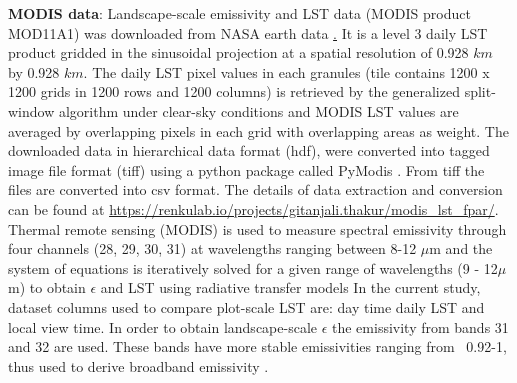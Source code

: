 \documentclass[fleqn,10pt]{wlscirep}
\begin{document}
\textbf{MODIS data}:
Landscape-scale emissivity and LST data (MODIS product MOD11A1) was downloaded from NASA earth data \href{https://lpdaac.usgs.gov/}. It is a level 3 daily LST product gridded in the sinusoidal projection at a spatial resolution of 0.928 $km$ by 0.928 $km$. The daily LST pixel values in each granules (tile contains 1200 x 1200 grids in 1200 rows and 1200 columns) is retrieved by the generalized split-window algorithm under clear-sky conditions and MODIS LST values are averaged by overlapping pixels in each grid with overlapping areas as weight\cite{wan2007collection}. The downloaded data in hierarchical data format (hdf), were converted into tagged image file format (tiff) using a python package called PyModis \cite{delucchi2014pymodis}. From tiff the files are converted into csv format. The details of data extraction and conversion can be found at \url{https://renkulab.io/projects/gitanjali.thakur/modis_lst_fpar/}.
Thermal remote sensing (MODIS) is used to measure spectral emissivity through four channels (28, 29, 30, 31) at wavelengths ranging between 8-12 $\mu$m \cite{jin2006improved} and the system of equations is iteratively solved for a given range of wavelengths (9 - 12$\mu$m) to obtain $\epsilon$ and LST using radiative transfer models\cite{hulley2012quantifying,jin2006improved,wang2009evaluation} In the current study,  dataset columns used to compare plot-scale LST are: day time daily LST and local view time. In order to obtain landscape-scale $\epsilon$ the emissivity from bands 31 and 32 are used. These bands have more stable emissivities ranging from ~0.92-1, thus used to derive broadband emissivity \cite{wan2007collection}. 
\end{document}
